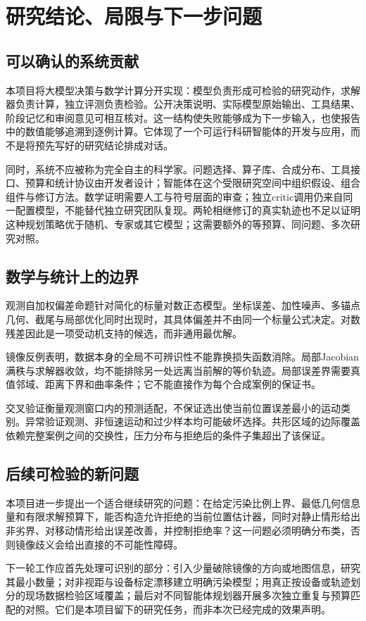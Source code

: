 \section{研究结论、局限与下一步问题}
\label{sec:discussion}

\subsection{可以确认的系统贡献}
本项目将大模型决策与数学计算分开实现：模型负责形成可检验的研究动作，求解器负责计算，独立评测负责检验。公开决策说明、实际模型原始输出、工具结果、阶段记忆和审阅意见可相互核对。这一结构使失败能够成为下一步输入，也使报告中的数值能够追溯到逐例计算。它体现了一个可运行科研智能体的开发与应用，而不是将预先写好的研究结论排成对话。

同时，系统不应被称为完全自主的科学家。问题选择、算子库、合成分布、工具接口、预算和统计协议由开发者设计；智能体在这个受限研究空间中组织假设、组合组件与修订方法。数学证明需要人工与符号层面的审查；独立critic调用仍来自同一配置模型，不能替代独立研究团队复现。两轮相继修订的真实轨迹也不足以证明这种规划策略优于随机、专家或其它模型；这需要额外的等预算、同问题、多次研究对照。

\subsection{数学与统计上的边界}
观测自加权偏差命题针对简化的标量对数正态模型。坐标误差、加性噪声、多锚点几何、截尾与局部优化同时出现时，其具体偏差并不由同一个标量公式决定。对数残差因此是一项受动机支持的候选，而非通用最优解。

镜像反例表明，数据本身的全局不可辨识性不能靠换损失函数消除。局部Jacobian满秩与求解器收敛，均不能排除另一处远离当前解的等价轨迹。局部误差界需要真值邻域、距离下界和曲率条件；它不能直接作为每个合成案例的保证书。

交叉验证衡量观测窗口内的预测适配，不保证选出使当前位置误差最小的运动类别。异常验证观测、非恒速运动和过少样本均可能破坏选择。共形区域的边际覆盖依赖完整案例之间的交换性，压力分布与拒绝后的条件子集超出了该保证。

\subsection{后续可检验的新问题}
本项目进一步提出一个适合继续研究的问题：在给定污染比例上界、最低几何信息量和有限求解预算下，能否构造允许拒绝的当前位置估计器，同时对静止情形给出非劣界、对移动情形给出误差改善，并控制拒绝率？这一问题必须明确分布类，否则镜像歧义会给出直接的不可能性障碍。

下一轮工作应首先处理可识别的部分：引入少量破除镜像的方向或地图信息，研究其最小数量；对非视距与设备标定漂移建立明确污染模型；用真正按设备或轨迹划分的现场数据检验区域覆盖；最后对不同智能体规划器开展多次独立重复与预算匹配的对照。它们是本项目留下的研究任务，而非本次已经完成的效果声明。
